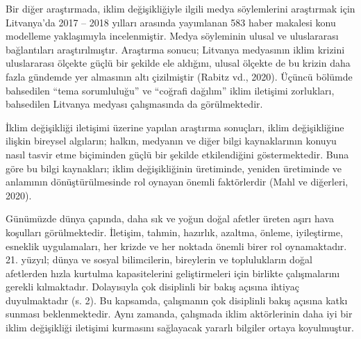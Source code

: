 \documentclass[
]{book}
\begin{document}
Bir diğer araştırmada, iklim değişikliğiyle ilgili medya söylemlerini araştırmak için Litvanya'da 2017 -- 2018 yılları arasında yayımlanan 583 haber makalesi konu modelleme yaklaşımıyla incelenmiştir. Medya söyleminin ulusal ve uluslararası bağlantıları araştırılmıştır. Araştırma sonucu; Litvanya medyasının iklim krizini uluslararası ölçekte güçlü bir şekilde ele aldığını, ulusal ölçekte de bu krizin daha fazla gündemde yer almasının altı çizilmiştir (Rabitz vd., 2020). Üçüncü bölümde bahsedilen ``tema sorumluluğu'' ve ``coğrafi dağılım'' iklim iletişimi zorlukları, bahsedilen Litvanya medyası çalışmasında da görülmektedir.

İklim değişikliği iletişimi üzerine yapılan araştırma sonuçları, iklim değişikliğine ilişkin bireysel algıların; halkın, medyanın ve diğer bilgi kaynaklarının konuyu nasıl tasvir etme biçiminden güçlü bir şekilde etkilendiğini göstermektedir. Buna göre bu bilgi kaynakları; iklim değişikliğinin üretiminde, yeniden üretiminde ve anlamının dönüştürülmesinde rol oynayan önemli faktörlerdir (Mahl ve diğerleri, 2020). \citep{mahl2020bit}

Günümüzde dünya çapında, daha sık ve yoğun doğal afetler üreten aşırı hava koşulları görülmektedir. İletişim, tahmin, hazırlık, azaltma, önleme, iyileştirme, esneklik uygulamaları, her krizde ve her noktada önemli birer rol oynamaktadır. 21. yüzyıl; dünya ve sosyal bilimcilerin, bireylerin ve toplulukların doğal afetlerden hızla kurtulma kapasitelerini geliştirmeleri için birlikte çalışmalarını gerekli kılmaktadır. Dolayısıyla çok disiplinli bir bakış açısına ihtiyaç duyulmaktadır (s. 2). \citep{drake2016communicating} Bu kapsamda, çalışmanın çok disiplinli bakış açısına katkı sunması beklenmektedir. Aynı zamanda, çalışmada iklim aktörlerinin daha iyi bir iklim değişikliği iletişimi kurmasını sağlayacak yararlı bilgiler ortaya koyulmuştur.
\end{document}
